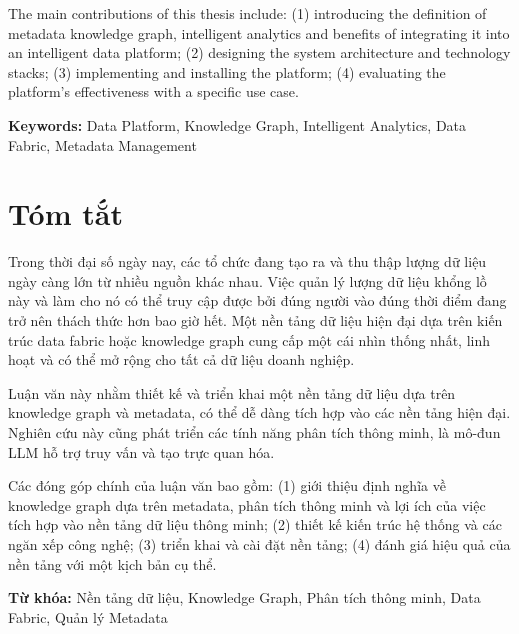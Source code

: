 \documentclass[12pt,a4paper,oneside]{book}
\theoremstyle{plain}
\begin{document}
The main contributions of this thesis include: (1) introducing the definition of metadata knowledge graph, intelligent analytics and benefits of integrating it into an intelligent data platform; (2) designing the system architecture and technology stacks; (3) implementing and installing the platform; (4) evaluating the platform's effectiveness with a specific use case.

\noindent\textbf{Keywords:} Data Platform, Knowledge Graph, Intelligent Analytics, Data Fabric, Metadata Management

\clearpage

\chapter*{Tóm tắt}

Trong thời đại số ngày nay, các tổ chức đang tạo ra và thu thập lượng dữ liệu ngày càng lớn từ nhiều nguồn khác nhau. Việc quản lý lượng dữ liệu khổng lồ này và làm cho nó có thể truy cập được bởi đúng người vào đúng thời điểm đang trở nên thách thức hơn bao giờ hết. Một nền tảng dữ liệu hiện đại dựa trên kiến trúc data fabric hoặc knowledge graph cung cấp một cái nhìn thống nhất, linh hoạt và có thể mở rộng cho tất cả dữ liệu doanh nghiệp.

Luận văn này nhằm thiết kế và triển khai một nền tảng dữ liệu dựa trên knowledge graph và metadata, có thể dễ dàng tích hợp vào các nền tảng hiện đại. Nghiên cứu này cũng phát triển các tính năng phân tích thông minh, là mô-đun LLM hỗ trợ truy vấn và tạo trực quan hóa.

Các đóng góp chính của luận văn bao gồm: (1) giới thiệu định nghĩa về knowledge graph dựa trên metadata, phân tích thông minh và lợi ích của việc tích hợp vào nền tảng dữ liệu thông minh; (2) thiết kế kiến trúc hệ thống và các ngăn xếp công nghệ; (3) triển khai và cài đặt nền tảng; (4) đánh giá hiệu quả của nền tảng với một kịch bản cụ thể.

\noindent\textbf{Từ khóa:} Nền tảng dữ liệu, Knowledge Graph, Phân tích thông minh, Data Fabric, Quản lý Metadata

\clearpage

\tableofcontents
\clearpage

\listoffigures
\clearpage
\end{document}
